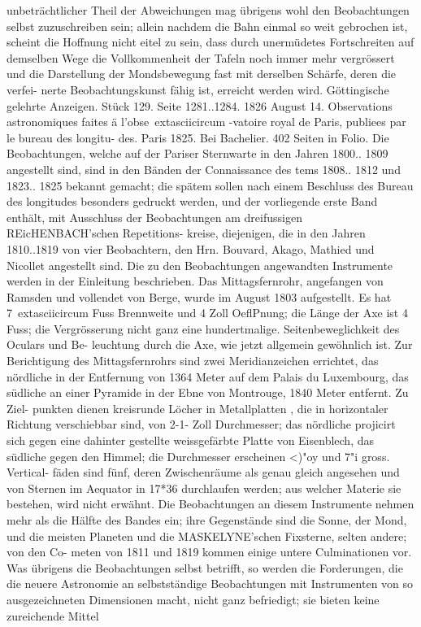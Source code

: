 \documentclass[12pt,a4paper]{article}
\begin{document}
{{{{{{{{unbeträchtlicher  Theil  der  Abweichungen  mag  übrigens  wohl  den  Beobachtungen  selbst  zuzuschreiben sein;  allein  nachdem  die  Bahn  einmal  so  weit  gebrochen  ist,  scheint  die  Hoffnung  nicht  eitel  zu  sein, dass  durch  unermüdetes  Fortschreiten  auf  demselben  Wege  die  Vollkommenheit  der  Tafeln  noch  immer mehr  vergrössert  und  die  Darstellung  der  Mondsbewegung  fast  mit  derselben  Schärfe,  deren  die  verfei- nerte Beobachtungskunst  fähig  ist,  erreicht  werden  wird. Göttingische  gelehrte  Anzeigen.     Stück  129.  Seite  1281..1284.     1826  August  14. Observations  astronomiques  faites  ä  l'obse\	extasciicircum{}{ }-vatoire  royal  de  Paris,    publiees  par  le  bureau  des  longitu- des.    Paris  1825.     Bei  Bachelier.     402  Seiten  in  Folio. Die  Beobachtungen,  welche  auf  der  Pariser  Sternwarte  in  den  Jahren  1800..  1809  angestellt  sind, sind  in  den  Bänden  der  Connaissance  des  tems  1808..  1812  und  1823..  1825  bekannt  gemacht;  die  spätem sollen  nach  einem  Beschluss  des  Bureau  des  longitudes  besonders  gedruckt  werden,  und  der  vorliegende erste  Band  enthält,  mit  Ausschluss  der  Beobachtungen  am  dreifussigen  REicHENBACH'schen  Repetitions- kreise,  diejenigen,  die  in  den  Jahren  1810..1819  von  vier  Beobachtern,  den  Hrn.  Bouvard,  Akago, Mathied  und  Nicollet  angestellt  sind.  Die  zu  den  Beobachtungen  angewandten  Instrumente  werden  in der  Einleitung  beschrieben.  Das  Mittagsfernrohr,  angefangen  von  Ramsden  und  vollendet  von  Berge, wurde  im  August  1803  aufgestellt.  Es  hat  7\	extasciicircum{}{ }  Fuss  Brennweite  und  4  Zoll  OeflPnung;  die  Länge  der  Axe ist  4  Fuss;  die  Vergrösserung  nicht  ganz  eine  hundertmalige.  Seitenbeweglichkeit  des  Oculars  und  Be- leuchtung durch  die  Axe,  wie  jetzt  allgemein  gewöhnlich  ist.  Zur  Berichtigung  des  Mittagsfernrohrs sind  zwei  Meridianzeichen  errichtet,  das  nördliche  in  der  Entfernung  von  1364  Meter  auf  dem  Palais  du Luxembourg,  das  südliche  an  einer  Pyramide  in  der  Ebne  von  Montrouge,  1840  Meter  entfernt.  Zu  Ziel- punkten dienen  kreisrunde  Löcher  in  Metallplatten ,  die  in  horizontaler  Richtung  verschiebbar  sind,  von 2-1-  Zoll  Durchmesser;  das  nördliche  projicirt  sich  gegen  eine  dahinter  gestellte  weissgefärbte  Platte  von Eisenblech,  das  südliche  gegen  den  Himmel;  die  Durchmesser  erscheinen  <)"oy  und  7"i  gross.  Vertical- fäden  sind  fünf,  deren  Zwischenräume  als  genau  gleich  angesehen  und  von  Sternen  im  Aequator  in 17*36  durchlaufen  werden;  aus  welcher  Materie  sie  bestehen,  wird  nicht  erwähnt.  Die  Beobachtungen an  diesem  Instrumente  nehmen  mehr  als  die  Hälfte  des  Bandes  ein;  ihre  Gegenstände  sind  die  Sonne, der  Mond,  und  die  meisten  Planeten  und  die  MASKELYNE'schen  Fixsterne,  selten  andere;  von  den  Co- meten  von  1811  und  1819  kommen  einige  untere  Culminationen  vor.  Was  übrigens  die  Beobachtungen selbst  betrifft,  so  werden  die  Forderungen,  die  die  neuere  Astronomie  an  selbstständige  Beobachtungen mit  Instrumenten  von  so  ausgezeichneten  Dimensionen  macht,  nicht  ganz  befriedigt;  sie  bieten  keine zureichende  Mittel  }}}}}}}}
\end{document}
